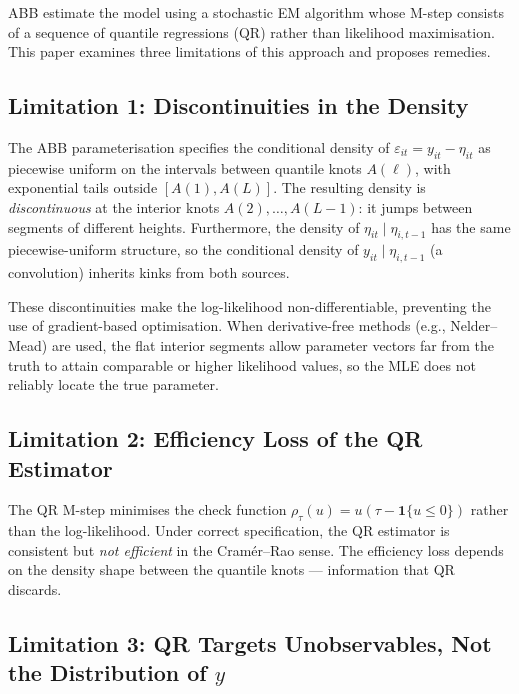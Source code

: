 \documentclass[12pt]{article}
\begin{document}
ABB estimate the model using a stochastic EM algorithm whose M-step consists of
a sequence of quantile regressions (QR) rather than likelihood maximisation.
This paper examines three limitations of this approach and proposes remedies.

\subsection*{Limitation 1: Discontinuities in the Density}

The ABB parameterisation specifies the conditional density of
$\varepsilon_{it} = y_{it} - \eta_{it}$ as piecewise uniform on the intervals
between quantile knots $A(\ell)$, with exponential tails outside
$[A(1), A(L)]$.
The resulting density is \emph{discontinuous} at the interior knots
$A(2), \ldots, A(L-1)$: it jumps between segments of different heights.
Furthermore, the density of $\eta_{it} \mid \eta_{i,t-1}$ has the same
piecewise-uniform structure, so the conditional density of
$y_{it} \mid \eta_{i,t-1}$ (a convolution) inherits kinks from both sources.

These discontinuities make the log-likelihood non-differentiable, preventing
the use of gradient-based optimisation.
When derivative-free methods (e.g., Nelder--Mead) are used, the flat interior
segments allow parameter vectors far from the truth to attain comparable or
higher likelihood values, so the MLE does not reliably locate the true
parameter.

\subsection*{Limitation 2: Efficiency Loss of the QR Estimator}

The QR M-step minimises the check function
$\rho_\tau(u) = u(\tau - \mathbf{1}\{u \le 0\})$
rather than the log-likelihood.
Under correct specification, the QR estimator is consistent but
\emph{not efficient} in the Cram\'er--Rao sense.
The efficiency loss depends on the density shape between the quantile knots
--- information that QR discards.

\subsection*{Limitation 3: QR Targets Unobservables, Not the Distribution of $y$}
\end{document}
